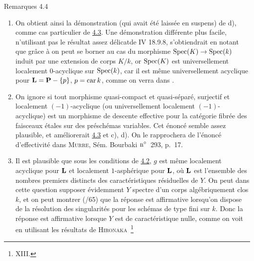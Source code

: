 \documentclass[10pt]{../fichiers-configuration-latex/smfart}
\begin{document}
\begin{enonce*}[remark]{Remarques 4.4}
\begin{enumerate}
\renewcommand{\theenumi}{\alph{enumi}}
\renewcommand{\labelenumi}{\theenumi)}
\item On obtient ainsi la démonstration (qui avait été laissée en
suspens) de  d), comme cas particulier de \hyperref[XV.cor4.3]{4.3}. %
Une démonstration différente plus facile, n'utilisant pas le résultat
assez délicat\pageoriginale de \EGA IV 18.9.8, s'obtiendrait en notant
que grâce à  on peut se borner au cas du morphisme
$\operatorname{Spec}(K)\rightarrow \operatorname{Spec}(k)$ induit par une extension de corps
$K/k$, or $\operatorname{Spec}(K)$ est universellement localement $0$-acyclique sur
$\operatorname{Spec}(k)$, car il est même universellement acyclique pour
$\mathbf{L}=\mathbf{P}-\{p\}$, $p=\operatorname{car} k$, comme on verra dans .

\item On ignore si tout morphisme quasi-compact et quasi-séparé,
surjectif et localement $(-1)$-acyclique (ou universellement
localement $(-1)$-acyclique) est un morphisme de descente effective
pour la catégorie fibrée des faisceaux étales sur des préschémas
variables. Cet énoncé semble assez plausible, et améliorerait \hyperref[XV.cor4.3]{4.3} et
 c), d). %
On le rapprochera de l'énoncé d'effectivité dans
\textsc{Murre}, Sém. Bourbaki ${\rm n^{\circ}}$~293, p.~17.

\item Il est plausible que sous les conditions de \hyperref[XV.cor4.2]{4.2}, $g$ est même
localement acyclique pour $\mathbf{L}$ et localement $1$-asphérique pour $\mathbf{L}$,
où $\mathbf{L}$ est l'ensemble des nombres premiers distincts des
caractéristiques résiduelles de $Y$. On peut dans cette question
supposer évidemment $Y$ spectre d'un corps algébriquement clos $k$, et
on peut montrer (/65) que la réponse est affirmative
lorsqu'on dispose de la résolution des singularités pour les schémas
de type fini sur $k$. Donc la réponse est affirmative lorsque $Y$ est
de caractéristique nulle, comme on voit en utilisant les résultats de
\textsc{Hironaka}~\footnote[1]{\Cf {} XIII.}
\end{enumerate}
\end{enonce*}



\ifx\danslelivre\undefined
\end{document}
